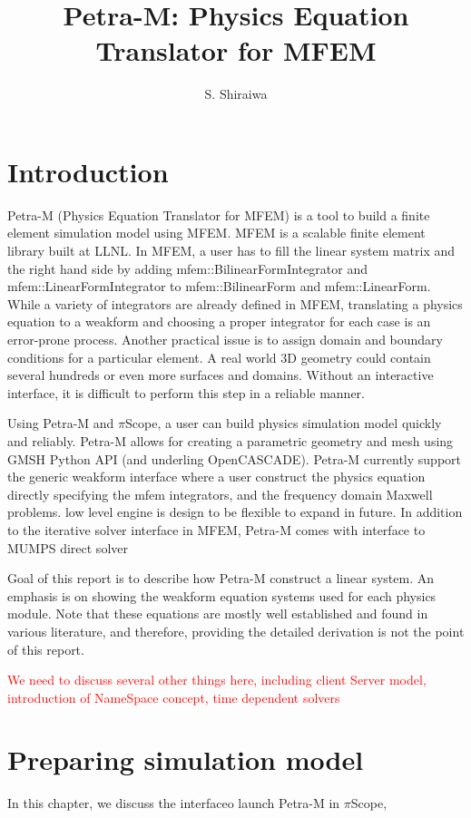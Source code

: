\documentclass[11pt,a4paper,final]{report}
\author{S. Shiraiwa}
\title{Petra-M: Physics Equation Translator for MFEM}
\begin{document}
\lstset{language=Python}
\maketitle
\tableofcontents
\newpage

\chapter{Introduction}
Petra-M (Physics Equation Translator for MFEM) is a tool to build a finite element simulation model using MFEM. 
MFEM is a scalable finite element library built at LLNL. In MFEM,  a user has to fill the linear system matrix and the right hand side by adding  mfem::BilinearFormIntegrator and mfem::LinearFormIntegrator to mfem::BilinearForm and mfem::LinearForm.
While a variety of integrators are already defined in MFEM, translating a physics equation to a weakform and choosing a proper integrator for each case is an error-prone process. 
Another practical issue is to assign domain and boundary conditions for a particular element. A real world 3D geometry could contain several hundreds or even more surfaces and domains. Without an interactive interface, it is difficult to perform this step in a reliable manner.

Using Petra-M and $\pi$Scope, a user can build physics simulation model quickly and reliably.
Petra-M allows for creating a parametric geometry and mesh using GMSH Python API (and underling OpenCASCADE). 
Petra-M currently support the generic weakform interface where a user construct the physics equation directly specifying the mfem integrators, and the frequency domain Maxwell problems. low level engine is design to be flexible to expand in future.
In addition to the iterative solver interface in MFEM, Petra-M comes with interface to MUMPS direct solver

Goal of this report is to describe how Petra-M construct a linear system. An emphasis is on showing the weakform equation systems used for each physics module. Note that these equations are mostly well established and found in various literature, and therefore, providing the detailed derivation is not the point of this report. 

\textcolor{red}{We need to discuss several other things here, including 
client Server model, introduction of  NameSpace concept, time dependent solvers
}

\chapter{Preparing simulation model}
In this chapter, we discuss the interfaceo launch Petra-M in $\pi$Scope, 
\end{document}
